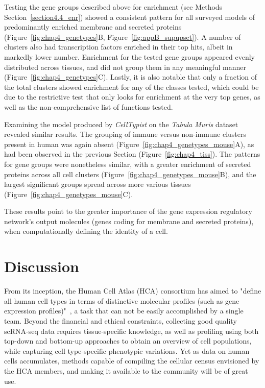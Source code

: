 Testing the gene groups described above for enrichment (see Methods Section~\ref{section4.4_enr}) showed a consistent pattern for all surveyed models of predominantly enriched membrane and secreted proteins (Figure~\ref{fig:chap4_genetypes}B, Figure~\ref{fig:appB_supupset}). A number of clusters also had transcription factors enriched in their top hits, albeit in markedly lower number. Enrichment for the tested gene groups appeared evenly distributed across tissues, and did not group them in any meaningful manner (Figure~\ref{fig:chap4_genetypes}C). Lastly, it is also notable that only a fraction of the total clusters showed enrichment for any of the classes tested, which could be due to the restrictive test that only looks for enrichment at the very top genes, as well as the non-comprehensive list of functions tested.

Examining the model produced by \textit{CellTypist} on the \textit{Tabula Muris} dataset revealed similar results. The grouping of immune versus non-immune clusters present in human was again absent (Figure~\ref{fig:chap4_genetypes_mouse}A), as had been observed in the previous Section (Figure~\ref{fig:chap4_tiss}). The patterns for gene groups were nonetheless similar, with a greater enrichment of secreted proteins across all cell clusters (Figure~\ref{fig:chap4_genetypes_mouse}B), and the largest significant groups spread across more various tissues (Figure~\ref{fig:chap4_genetypes_mouse}C).

These results point to the greater importance of the gene expression regulatory network's output molecules (genes coding for membrane and secreted proteins), when computationally defining the identity of a cell.


\section{Discussion}
\label{section4.3}
From its inception, the Human Cell Atlas (HCA) consortium has aimed to "define all human cell types in terms of distinctive molecular profiles (such as gene expression profiles)"~\citep{regev_human_2017}, a task that can not be easily accomplished by a single team. Beyond the financial and ethical constraints, collecting good quality scRNA-seq data requires tissue-specific knowledge, as well as profiling using both top-down and bottom-up approaches to obtain an overview of cell populations, while capturing cell type-specific phenotypic variations. Yet as data on human cells accumulates, methods capable of compiling the cellular census envisioned by the HCA members, and making it available to the community will be of great use.

